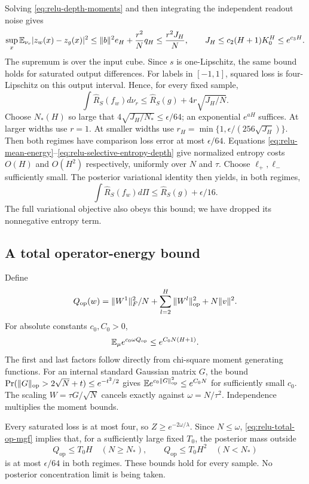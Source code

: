 Solving \eqref{eq:relu-depth-moments} and then integrating the independent readout noise gives
\begin{equation}
 \sup_x\mathbb E_{\nu_r}|z_w(x)-z_g(x)|^2
 \le \|b\|^2 e_H+\frac{r^2}{N}q_H
 \le\frac{r^2J_H}{N},\qquad
 J_H\le c_2(H+1)K_0^H\le e^{c_3H}.
 \label{eq:relu-unshrunk-depth-error}
\end{equation}
The supremum is over the input cube. Since $s$ is one-Lipschitz, the same bound holds for saturated output differences. For labels in $[-1,1]$, squared loss is four-Lipschitz on this output interval. Hence, for every fixed sample,
\[
 \int\widehat R_S(f_w)d\nu_r
 \le\widehat R_S(g)+4r\sqrt{J_H/N}.
\]
Choose $N_*(H)$ so large that $4\sqrt{J_H/N_*}\le\epsilon/64$; an exponential $e^{aH}$ suffices. At larger widths use $r=1$. At smaller widths use
$r_H=\min\{1,\epsilon/(256\sqrt{J_H})\}$.
Then both regimes have comparison loss error at most $\epsilon/64$. Equations \eqref{eq:relu-mean-energy}--\eqref{eq:relu-selective-entropy-depth} give normalized entropy costs $O(H)$ and $O(H^2)$ respectively, uniformly over $N$ and $\tau$. Choose $\ell_+,\ell_-$ sufficiently small. The posterior variational identity then yields, in both regimes,
\begin{equation}
 \int\widehat R_S(f_w)d\Pi
 \le\widehat R_S(g)+\epsilon/16.
 \label{eq:relu-depth-objective}
\end{equation}
The full variational objective also obeys this bound; we have dropped its nonnegative entropy term.

\subsection{A total operator-energy bound}
Define
\[
 Q_{\mathrm{op}}(w)=\|W^1\|_F^2/N+
       \sum_{l=2}^H\|W^l\|_{\mathrm{op}}^2+N\|v\|^2.
\]
For absolute constants $c_0,C_0>0$,
\begin{equation}
 \mathbb E_\mu e^{c_0\omega Q_{\mathrm{op}}}
 \le e^{C_0N(H+1)}.
 \label{eq:relu-total-op-mgf}
\end{equation}
The first and last factors follow directly from chi-square moment generating functions. For an internal standard Gaussian matrix $G$, the bound
$\Pr(\|G\|_{\mathrm{op}}>2\sqrt N+t)\le e^{-t^2/2}$ gives
$\mathbb E e^{c_0\|G\|_{\mathrm{op}}^2}\le e^{C_0N}$ for sufficiently small $c_0$.
The scaling $W=\tau G/\sqrt N$ cancels exactly against $\omega=N/\tau^2$. Independence multiplies the moment bounds.

Every saturated loss is at most four, so $Z\ge e^{-2\omega/\lambda}$. Since $N\le\omega$, \eqref{eq:relu-total-op-mgf} implies that, for a sufficiently large fixed $T_0$, the posterior mass outside
\[
 Q_{\mathrm{op}}\le T_0H\quad(N\ge N_*),\qquad
 Q_{\mathrm{op}}\le T_0H^2\quad(N<N_*)
\]
is at most $\epsilon/64$ in both regimes. These bounds hold for every sample. No posterior concentration limit is being taken.

